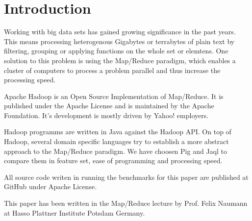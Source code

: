 \section{Introduction}

Working with big data sets has gained growing significance in the past years. This means processing heterogenous Gigabytes or terrabytes of plain text by filtering, grouping or applying functions on the whole set or elemtens. One solution to this problem is using the Map/Reduce paradigm, which enables a cluster of computers to process a problem parallel and thus increase the processing speed.

Apache Hadoop is an Open Source Implementation of Map/Reduce. It is published under the Apache License and is maintained by the Apache Foundation. It's development is mostly driven by Yahoo! employers.

Hadoop programms are written in Java against the Hadoop API. On top of Hadoop, several domain specific languages try to establish a more abstract approach to the Map/Reduce paradigm. We have choosen Pig and Jaql to compare them in feature set, ease of programming and processing speed.

All source code writen in running the benchmarks for this paper are published at GitHub under Apache License.

This paper has been written in the Map/Reduce lecture by Prof. Felix Naumann at Hasso Plattner Institute Potsdam Germany.